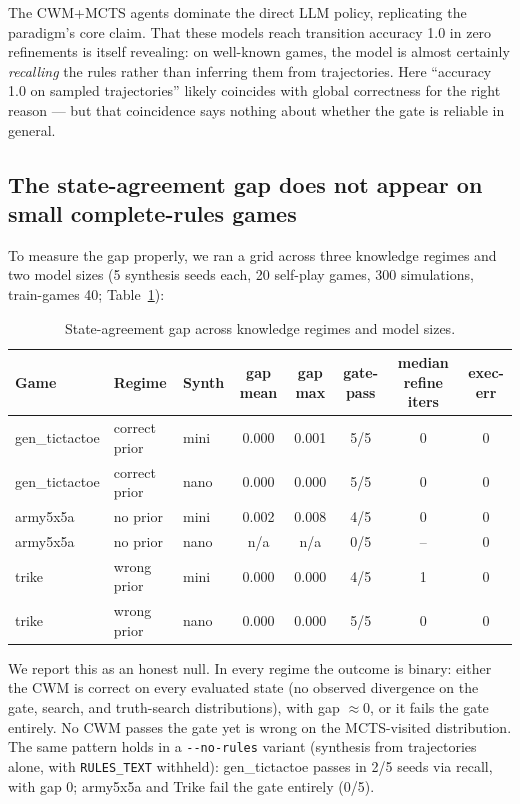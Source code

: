 \documentclass[11pt]{article}
\theoremstyle{remark}
\begin{document}
The CWM+MCTS agents dominate the direct LLM policy, replicating the paradigm's core claim. That these models reach transition accuracy 1.0 in zero refinements is itself revealing: on well-known games, the model is almost certainly \emph{recalling} the rules rather than inferring them from trajectories. Here ``accuracy 1.0 on sampled trajectories'' likely coincides with global correctness for the right reason --- but that coincidence says nothing about whether the gate is reliable in general.

\subsection{The state-agreement gap does not appear on small complete-rules games}
\label{sec:null-gap}

To measure the gap properly, we ran a grid across three knowledge regimes and two model sizes (5 synthesis seeds each, 20 self-play games, 300 simulations, train-games 40; Table~\ref{tab:nullgap}):

\begin{table}[ht]
\centering
\small
\begin{tabular}{lllccccc}
\toprule
Game & Regime & Synth & gap mean & gap max & gate-pass & median refine iters & exec-err \\
\midrule
gen\_tictactoe & correct prior & mini & 0.000 & 0.001 & 5/5 & 0 & 0 \\
gen\_tictactoe & correct prior & nano & 0.000 & 0.000 & 5/5 & 0 & 0 \\
army5x5a       & no prior      & mini & 0.002 & 0.008 & 4/5 & 0 & 0 \\
army5x5a       & no prior      & nano & n/a   & n/a   & 0/5 & -- & 0 \\
trike          & wrong prior   & mini & 0.000 & 0.000 & 4/5 & 1 & 0 \\
trike          & wrong prior   & nano & 0.000 & 0.000 & 5/5 & 0 & 0 \\
\bottomrule
\end{tabular}
\caption{State-agreement gap across knowledge regimes and model sizes.}
\label{tab:nullgap}
\end{table}

We report this as an honest null. In every regime the outcome is binary: either the CWM is correct on every evaluated state (no observed divergence on the gate, search, and truth-search distributions), with gap $\approx 0$, or it fails the gate entirely. No CWM passes the gate yet is wrong on the MCTS-visited distribution. The same pattern holds in a \texttt{-{}-no-rules} variant (synthesis from trajectories alone, with \texttt{RULES\_TEXT} withheld): gen\_tictactoe passes in 2/5 seeds via recall, with gap 0; army5x5a and Trike fail the gate entirely (0/5).
\end{document}
